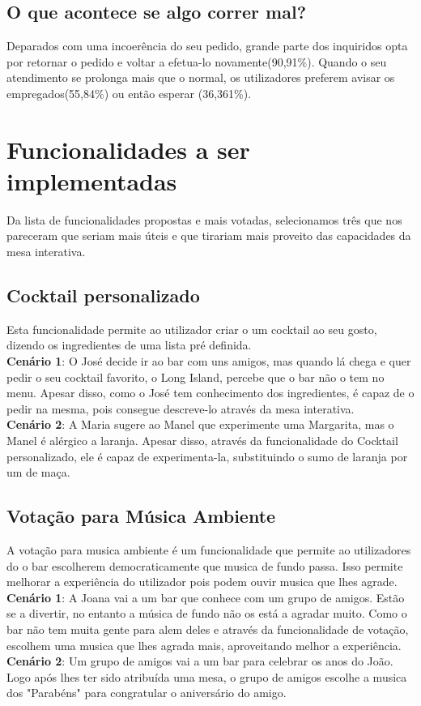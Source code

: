 \documentclass{article}
\begin{document}
\subsection*{O que acontece se algo correr mal?}
Deparados com uma incoerência do seu pedido, grande parte dos inquiridos opta por retornar o pedido e voltar a efetua-lo novamente(90,91\%). Quando o seu atendimento se prolonga mais que o normal, os utilizadores preferem avisar os empregados(55,84\%) ou então esperar (36,361\%).

\section*{Funcionalidades a ser implementadas}

Da lista de funcionalidades propostas e mais votadas, selecionamos três que nos pareceram que seriam mais úteis e que tirariam mais proveito das capacidades da mesa interativa.

\subsection*{Cocktail personalizado}
Esta funcionalidade permite ao utilizador criar o um cocktail ao seu gosto, dizendo os ingredientes de uma lista pré definida.\\
\textbf{Cenário 1}: O José decide ir ao bar com uns amigos, mas quando lá chega e quer pedir o seu cocktail favorito, o Long Island, percebe que o bar não o tem no menu. Apesar disso, como o José tem conhecimento dos ingredientes, é capaz de o pedir na mesma, pois consegue descreve-lo através da mesa interativa.\\
\textbf{Cenário 2}: A Maria sugere ao Manel que experimente uma Margarita, mas o Manel é alérgico a laranja. Apesar disso, através da funcionalidade do Cocktail personalizado, ele é capaz de experimenta-la, substituindo o sumo de laranja por um de maça.
\\

\subsection*{Votação para Música Ambiente}
A votação para musica ambiente é um funcionalidade que permite ao utilizadores do o bar escolherem democraticamente que musica de fundo passa. Isso permite melhorar a experiência do utilizador pois podem ouvir musica que lhes agrade.\\
\textbf{Cenário 1}: A Joana vai a um bar que conhece com um grupo de amigos. Estão se a divertir, no entanto a música de fundo não os está a agradar muito. Como o bar não tem muita gente para alem deles e através da funcionalidade de votação, escolhem uma musica que lhes agrada mais, aproveitando melhor a experiência.\\
\textbf{Cenário 2}: Um grupo de amigos vai a um bar para celebrar os anos do João. Logo após lhes ter sido atribuída uma mesa, o grupo de amigos escolhe a musica dos "Parabéns" para congratular o aniversário do amigo.
\end{document}
